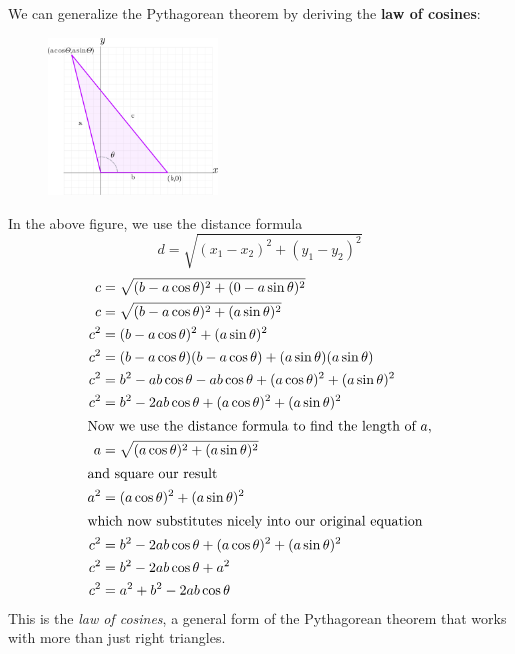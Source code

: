 We can generalize the Pythagorean theorem by deriving the \textbf{law of cosines}:
\begin{figure}[H]
  \begin{center}
    \includegraphics[width=0.4\textwidth]{continuous/trig/lawcosines}
  \end{center}
\end{figure}
In the above figure, we use the distance formula
\begin{equation}
  d=\sqrt{(x_1 - x_2)^2+(y_1-y_2)^2}
  \label{eq:distance}
\end{equation}
\begin{align}
  \notag  c &= \sqrt{(b-a\cos \theta)^2+(0-a\sin\theta)^2} \\
  \notag  c&=\sqrt{(b-a\cos\theta)^2+(a\sin\theta)^2} \\
  \notag  c^2&=(b-a\cos\theta)^2+(a\sin\theta)^2 \\
  \notag  c^2 &= (b-a\cos\theta)(b-a\cos\theta)+(a\sin\theta)(a\sin\theta) \\
  \notag  c^2 &= b^2 -ab\cos\theta -ab\cos\theta+(a\cos\theta)^2+(a\sin\theta)^2\\
  \notag  c^2&=b^2-2ab\cos\theta+(a\cos\theta)^2+(a\sin\theta)^2\\
  \intertext{Now we use the distance formula to find the length of $a$,}
  \notag  a&=\sqrt{(a\cos\theta)^2+(a\sin\theta)^2}\\
  \intertext{and square our result}
  \notag  a^2&=(a\cos\theta)^2+(a\sin\theta)^2\\
  \intertext{which now substitutes nicely into our original equation}
  \notag  c^2&=b^2-2ab\cos\theta+(a\cos\theta)^2+(a\sin\theta)^2\\
  \notag  c^2&=b^2-2ab\cos\theta+a^2\\
  c^2&=a^2+b^2-2ab\cos\theta
\end{align}
This is the \emph{law of cosines},
a general form of the Pythagorean theorem
that works with more than just right triangles.

